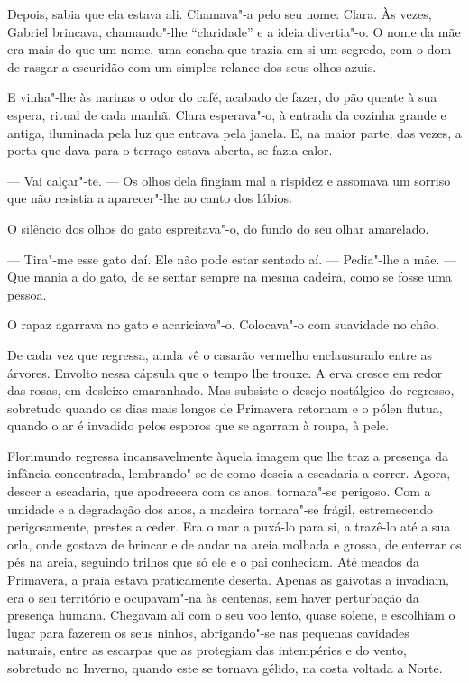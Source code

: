 Depois, sabia que ela estava ali. Chamava"-a pelo seu nome: Clara. Às
vezes, Gabriel brincava, chamando"-lhe ``claridade'' e a ideia
divertia"-o. O nome da mãe era mais do que um nome, uma concha que trazia
em si um segredo, com o dom de rasgar a escuridão com um simples relance
dos seus olhos azuis.

E vinha"-lhe às narinas o odor do café, acabado de fazer, do pão quente à
sua espera, ritual de cada manhã. Clara esperava"-o, à entrada da cozinha
grande e antiga, iluminada pela luz que entrava pela janela. E, na maior
parte, das vezes, a porta que dava para o terraço estava aberta, se
fazia calor.

--- Vai calçar"-te. --- Os olhos dela fingiam mal a rispidez e assomava um
sorriso que não resistia a aparecer"-lhe ao canto dos lábios.

O silêncio dos olhos do gato espreitava"-o, do fundo do seu olhar
amarelado.

--- Tira"-me esse gato daí. Ele não pode estar sentado aí. --- Pedia"-lhe a
mãe. --- Que mania a do gato, de se sentar sempre na mesma cadeira, como
se fosse uma pessoa.

O rapaz agarrava no gato e acariciava"-o. Colocava"-o com suavidade no
chão.

De cada vez que regressa, ainda vê o casarão vermelho enclausurado entre
as árvores. Envolto nessa cápsula que o tempo lhe trouxe. A erva cresce
em redor das rosas, em desleixo emaranhado. Mas subsiste o desejo
nostálgico do regresso, sobretudo quando os dias mais longos de
Primavera retornam e o pólen flutua, quando o ar é invadido pelos
esporos que se agarram à roupa, à pele.

Florimundo regressa incansavelmente àquela imagem que lhe traz a
presença da infância concentrada, lembrando"-se de como descia a
escadaria a correr. Agora, descer a escadaria, que apodrecera com os
anos, tornara"-se perigoso. Com a umidade e a degradação dos anos, a
madeira tornara"-se frágil, estremecendo perigosamente, prestes a ceder.
Era o mar a puxá-lo para si, a trazê-lo até a sua orla, onde gostava de
brincar e de andar na areia molhada e grossa, de enterrar os pés na
areia, seguindo trilhos que só ele e o pai conheciam. Até meados da
Primavera, a praia estava praticamente deserta. Apenas as gaivotas a
invadiam, era o seu território e ocupavam"-na às centenas, sem haver
perturbação da presença humana. Chegavam ali com o seu voo lento, quase
solene, e escolhiam o lugar para fazerem os seus ninhos, abrigando"-se
nas pequenas cavidades naturais, entre as escarpas que as protegiam das
intempéries e do vento, sobretudo no Inverno, quando este se tornava
gélido, na costa voltada a Norte.

